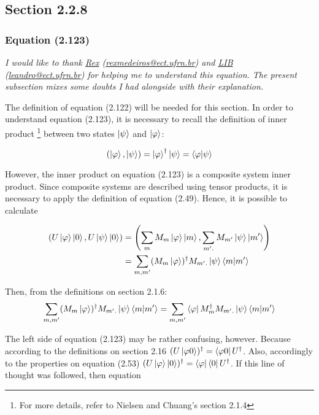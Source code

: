 \subsection{Section 2.2.8}
\subsubsection{Equation (2.123)}

\emph{I would like to thank
    \href{http://buscatextual.cnpq.br/buscatextual/visualizacv.do?id=K4774458A4}{Rex}
    (\href{mailto:rexmedeiros@ect.ufrn.br}{rexmedeiros@ect.ufrn.br})
    and
    \href{http://buscatextual.cnpq.br/buscatextual/visualizacv.do?id=K4733964Y9&idiomaExibicao=2}{LIB} 
    (\href{mailto:leandro@ect.ufrn.br}{leandro@ect.ufrn.br})
    for helping me to understand this equation. The present subsection mixes some doubts I had alongside with their explanation.
}

The definition of equation (2.122) will be needed for this section. In order to understand equation (2.123), it is necessary to recall the definition of inner product \footnote{For more details, refer to Nielsen and Chuang's section 2.1.4} between two states $\ket{\psi}$ and $\ket{\varphi}$:

\[
(\ket{\varphi}, \ket{\psi}) = \ket{\varphi}^\dagger \ket{\psi} = \braket{\varphi | \psi}
\]

However, the inner product on equation (2.123) is a composite system inner product. Since composite systems are described using tensor products, it is necessary to apply the definition of equation (2.49). Hence, it is possible to calculate

\begin{align}
    \left( U \ket{\varphi} \ket{0}, U \ket{\psi} \ket{0} \right) &= 
    \left( \sum_m M_m \ket{\varphi} \ket{m} , \sum_{m'.} M_{m'} \ket{\psi} \ket{m'} \right)
    \\
    &= \sum_{m, m'} (M_m\ket{\varphi})^\dagger M_{m'.}\ket{\psi} \braket{m | m'}
\end{align}

Then, from the definitions on section 2.1.6:
\begin{align}
    \sum_{m, m'} (M_m\ket{\varphi})^\dagger M_{m'.}\ket{\psi} \braket{m | m'} =
    \sum_{m, m'} \bra{\varphi} M_m^\dagger M_{m'.}\ket{\psi} \braket{m | m'}
\end{align}


The left side of equation (2.123) may be rather confusing, however. Because according to the definitions on section 2.16 $(U \ket{\varphi 0})^\dagger = \bra{\varphi 0} U^\dagger$. Also, accordingly to the properties on equation (2.53)  $(U \ket{\varphi} \ket{0})^\dagger = \bra{\varphi} \bra{0} U^\dagger$. If this line of thought was followed, then equation

